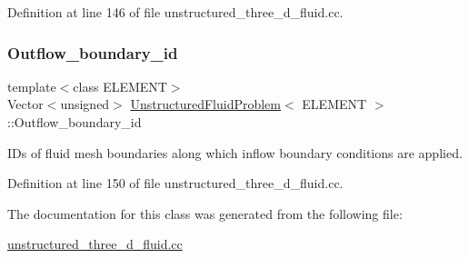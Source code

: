 Definition at line 146 of file unstructured\+\_\+three\+\_\+d\+\_\+fluid.\+cc.

\mbox{\label{classUnstructuredFluidProblem_a9bace139103152045dfe88e3d0163811}} 
\subsubsection{\texorpdfstring{Outflow\+\_\+boundary\+\_\+id}{Outflow\_boundary\_id}}
{\footnotesize\ttfamily template$<$class E\+L\+E\+M\+E\+NT$>$ \\
Vector$<$unsigned$>$ \hyperlink{classUnstructuredFluidProblem}{Unstructured\+Fluid\+Problem}$<$ E\+L\+E\+M\+E\+NT $>$\+::Outflow\+\_\+boundary\+\_\+id}



I\+Ds of fluid mesh boundaries along which inflow boundary conditions are applied. 



Definition at line 150 of file unstructured\+\_\+three\+\_\+d\+\_\+fluid.\+cc.



The documentation for this class was generated from the following file\+:\begin{DoxyCompactItemize}
\item 
\hyperlink{unstructured__three__d__fluid_8cc}{unstructured\+\_\+three\+\_\+d\+\_\+fluid.\+cc}\end{DoxyCompactItemize}
